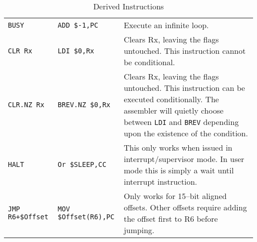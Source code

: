 \documentclass{gqtekspec}
\begin{document}
\begin{table}
\begin{center}
\begin{tabular}{p{1.0in}p{1.5in}p{3in}}
{\tt BUSY } & {\tt ADD \$-1,PC} & Execute an infinite loop.\\
{\tt CLR Rx}
	& {\tt LDI \$0,Rx}
	& Clears Rx, leaving the flags untouched.  This instruction cannot be
		conditional. \\\hline
{\tt CLR.NZ Rx }
	& {\tt BREV.NZ \$0,Rx}
	& Clears Rx, leaving the flags untouched.  This instruction can be
		executed conditionally. The assembler will quietly choose
		between {\tt LDI} and {\tt BREV} depending upon the existence
		of the condition.\\\hline
{\tt HALT }
	& {\tt Or \$SLEEP,CC}
	& This only works when issued in interrupt/supervisor mode.  In user
	mode this is simply a wait until interrupt instruction.  \\\hline
\hbox{\tt JMP R6+\$Offset}
	& {\tt MOV \$Offset(R6),PC}
	& Only works for 15--bit aligned offsets.  Other offsets require adding
	the offset first to R6 before jumping.\\\hline
\end{tabular}
\caption{Derived Instructions}\label{tbl:derived-1}
\end{center}\end{table}
\end{document}
